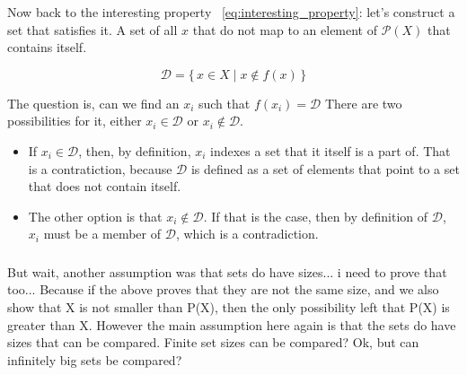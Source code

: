 \documentclass[11pt,a4paper]{article}
\begin{document}
Now back to the interesting property ~\eqref{eq:interesting_property}: let's construct a set that satisfies it.
A set of all $x$ that do not map to an element of $\mathcal{P}(X)$ that contains itself.

\[
\mathcal{D} = \{\, x \in X \mid x \notin f(x) \,\}
\]


The question is, can we find an $x_i$ such that $f(x_i) = \mathcal{D}$
There are two possibilities for it, either $x_i \in \mathcal{D}$ or $x_i \notin \mathcal{D}$.

\begin{itemize}
  \item If $x_i \in \mathcal{D}$, then, by definition, $x_i$ indexes a set that it itself is a part of.
        That is a contratiction, because $\mathcal{D}$ is defined as a set of elements that point to a
        set that does not contain itself.
  \item The other option is that $x_i \notin \mathcal{D}$. If that is the case, then by definition of
        $\mathcal{D}$, $x_i$ must be a member of $\mathcal{D}$, which is a contradiction.
\end{itemize}

\subsubsection{}

But wait, another assumption was that sets do have sizes... i need to prove that too...
Because if the above proves that they are not the same size, and we also show that X is not smaller than P(X),
then the only possibility left that P(X) is greater than X. However the main assumption here again is that the
sets do have sizes that can be compared. Finite set sizes can be compared? Ok, but can infinitely big sets be
compared?
\end{document}
